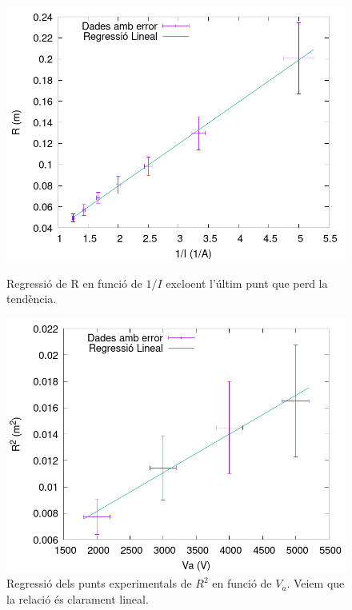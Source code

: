 \documentclass[11pt]{article}
\numberwithin{equation}{section}
\numberwithin{figure}{section}
\numberwithin{table}{section}
\begin{document}
\begin{figure}[h]
    \centering
    \begin{minipage}{0.45\textwidth}
        \centering
        \includegraphics[width=\textwidth]{RvsI.png}
        \caption{Regressió de R en funció de $1/I$ excloent l'últim punt que perd la tendència.}
        \label{fig: RvsI}
    \end{minipage}
    \hfill
    \begin{minipage}{0.45\textwidth} 
        \centering
        \includegraphics[width=\textwidth]{RvsVa.png}
        \caption{Regressió dels punts experimentals de $R^2$ en funció de $V_a$. Veiem que la relació és clarament lineal.}
        \label{fig: RvsVa}
    \end{minipage}
\end{figure}
\end{document}
